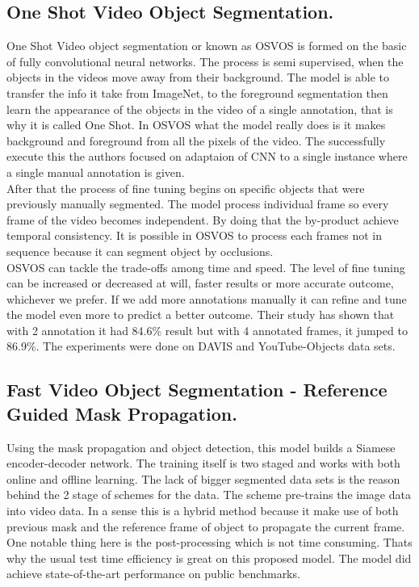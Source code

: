 \documentclass[conference]{IEEEtran}
\begin{document}
\subsection{One Shot Video Object Segmentation.} One Shot Video object segmentation or known as OSVOS\cite{caelles2017one} is formed on the basic of fully convolutional neural networks. The process is semi supervised, when the objects in the videos move away from their background. The model is able to transfer the info it take from ImageNet, to the foreground segmentation then learn the appearance of the objects in the video of a single annotation, that is why it is called One Shot. In OSVOS what the model really does is it makes background and foreground from all the pixels of the video. The successfully execute  this the authors focused on adaptaion of CNN to a single instance where a single manual annotation is given.\\
After that the process of fine tuning begins on specific objects that were previously manually segmented. The model process individual frame so every frame of the video becomes independent. By doing that the by-product achieve temporal consistency. It is possible in OSVOS to process each frames not in sequence because it can segment object by occlusions.\\
OSVOS can tackle the trade-offs among time and speed. The level of fine tuning can be increased or decreased at will, faster results or more accurate outcome, whichever we prefer. If we add more annotations manually it can refine and tune the model even more to predict a better outcome. Their study has shown that with 2 annotation it had 84.6\% result but with 4 annotated frames, it jumped to 86.9\%. The experiments were done on DAVIS and YouTube-Objects\cite{xu2018youtube} data sets.



\subsection{Fast Video Object Segmentation - Reference Guided Mask Propagation.}
Using the mask propagation and object detection, this model builds a Siamese encoder-decoder network. The training itself is two staged and works with both online and offline learning. The lack of bigger segmented data sets is the reason behind the 2 stage of schemes for the data. The scheme pre-trains the image data into video data. In a sense this is a hybrid method because it make use of both previous mask and the reference frame of object to propagate the current frame.
One notable thing here is the post-processing which is not time consuming. Thats why the usual test time efficiency is great on this proposed model. The model did achieve state-of-the-art performance on public benchmarks. 
\end{document}
